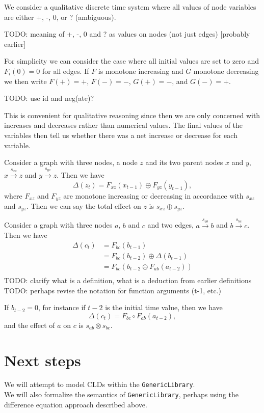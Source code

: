 \documentclass[a4paper,11pt]{article}
\begin{document}
We consider a qualitative discrete time system where all values of
node variables are either +, -, 0, or ? (ambiguous).

TODO: meaning of +, -, 0 and ? as values on nodes (not just edges) [probably earlier]

For simplicity we can consider the case where all initial values are
set to zero and $F_i(0)=0$ for all edges.
%
If $F$ is monotone increasing and $G$ monotone decreasing we then
write $F(+) = +$, $F(-) = -$, $G(+)=-$, and $G(-)=+$.

TODO: use id and neg(ate)?

This is convenient for qualitative reasoning since then we are only
concerned with increases and decreases rather than numerical values.
%
The final values of the variables then tell us whether there was a net
increase or decrease for each variable.

Consider a graph with three nodes, a node $z$ and its two parent nodes
$x$ and $y$, $x\xrightarrow{s_{xz}} z$ and $y\xrightarrow{s_{yz}} z$.
%
Then we have
\[\Delta(z_t) = F_{xz}(x_{t-1}) \oplus F_{yz}(y_{t-1}),\]
where $F_{xz}$ and $F_{yz}$ are monotone increasing or decreasing in
accordance with $s_{xz}$ and $s_{yz}$.
%
Then we can say the total effect on $z$ is $s_{xz}\oplus s_{yz}$.

Consider a graph with three nodes $a$, $b$ and $c$ and two edges,
$a\xrightarrow{s_{ab}} b$ and $b\xrightarrow{s_{bc}} c$. Then we have
\begin{align*}
\Delta(c_t) &= F_{bc}(b_{t-1})\\
&= F_{bc}(b_{t-2}) \oplus \Delta(b_{t-1})\\
&= F_{bc}(b_{t-2}  \oplus F_{ab}(a_{t-2}))\\
\end{align*}
TODO: clarify what is a definition, what is a deduction from earlier definitions
TODO: perhaps revise the notation for function arguments (t-1, etc.)

If $b_{t-2} = 0$, for instance if $t-2$ is the initial time value,
then we have
\[\Delta(c_t) = F_{bc}\circ F_{ab}(a_{t-2}),\]
and the effect of $a$ on $c$ is $s_{ab}\otimes s_{bc}$.

\section{Next steps}
We will attempt to model CLDs within the \verb|GenericLibrary|.\\

We will also formalize the semantics of \verb|GenericLibrary|, perhaps
using the difference equation approach described above.
\end{document}
